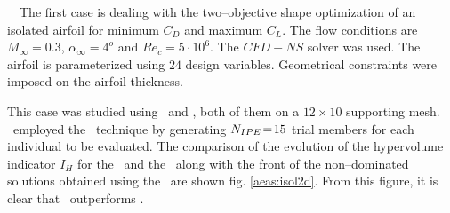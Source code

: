 \documentclass{vki_ls}
\newcommand{\xeraki}{\Pisymbol{ding}{13}~~}
\begin{document}
%
%
\xeraki The first case is dealing with the two--objective shape optimization of an isolated airfoil for minimum $C_D$ and maximum $C_L$.
The flow conditions are $M_{\infty}\!=\!0.3$, $\alpha_{\infty}\!=\!4^o$ and $Re_c \!=\! 5 \cdot 10^6$. The $CFD\!-\!NS$ solver was used. The airfoil is parameterized using $24$ design variables. Geometrical constraints were imposed
on the airfoil thickness.

This case was studied using \AEA\ and \AMAEA, both of them on a $12\!\times\!10$ supporting mesh. \AMAEA\ employed the \IPE\ technique by generating $N_{IPE}\!=\!15$ trial members for each individual to be evaluated. 
The comparison of the evolution of the hypervolume indicator $I_H$ for the \AEA\ and the \AMAEA\ along with the front of the non--dominated solutions obtained using the \AMAEA\ are shown fig. \ref{aeas:isol2d}. 
From this figure, it is clear that \AMAEA\ outperforms \AEA.
\end{document}
